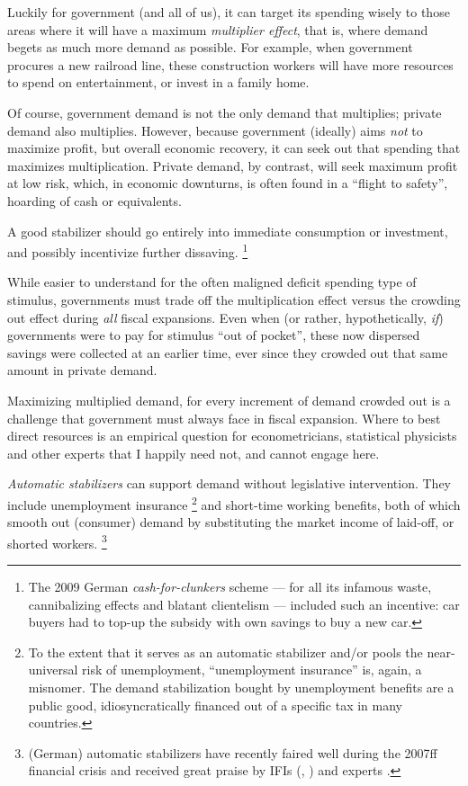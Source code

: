 Luckily for government (and all of us), it can target its spending wisely to those areas where it will have a maximum \emph{multiplier effect}, that is, where demand begets as much more demand as possible.
For example, when government procures a new railroad line, these construction workers will have more resources to spend on entertainment, or invest in a family home.

Of course, government demand is not the only demand that multiplies;
private demand also multiplies.
However, because government (ideally) aims \emph{not} to maximize profit, but overall economic recovery, it can seek out that spending that maximizes multiplication.
Private demand, by contrast, will seek maximum profit at low risk, which, in economic downturns, is often found in a ``flight to safety'', hoarding of cash or equivalents.

A good stabilizer should go entirely into immediate consumption or investment, and possibly incentivize further dissaving.
\footnote{
	The 2009 German \emph{cash-for-clunkers} scheme --- for all its infamous waste, cannibalizing effects and blatant clientelism --- included such an incentive:
	car buyers had to top-up the subsidy with own savings to buy a new car.
}

While easier to understand for the often maligned deficit spending type of stimulus, governments must trade off the multiplication effect versus the crowding out effect during \emph{all} fiscal expansions.
Even when (or rather, hypothetically, \emph{if}) governments were to pay for stimulus ``out of pocket'', these now dispersed savings were collected at an earlier time, ever since they crowded out that same amount in private demand.

Maximizing multiplied demand, for every increment of demand crowded out is a challenge that government must always face in fiscal expansion.
Where to best direct resources is an empirical question for econometricians, statistical physicists and other experts that I happily need not, and cannot engage here.


\emph{Automatic stabilizers}
can support demand without legislative intervention.
They include unemployment insurance
\footnote{
	To the extent that it serves as an automatic stabilizer and/or pools the near-universal risk of unemployment, ``unemployment insurance'' is, again, a misnomer.
	The demand stabilization bought by unemployment benefits are a public good, idiosyncratically financed out of a specific tax in many countries.
}
and short-time working benefits, both of which smooth out (consumer) demand by substituting the market income of laid-off, or shorted workers.
\footnote{
	(German) automatic stabilizers have recently faired well during the 2007ff financial crisis and received great praise by \glspl{IFI} (\citealt[20]{IMF-2008-ab}, \citealt[19]{WorldBank2008}) and experts \citep[8]{BofingerFranz-2007-aa}.
}

